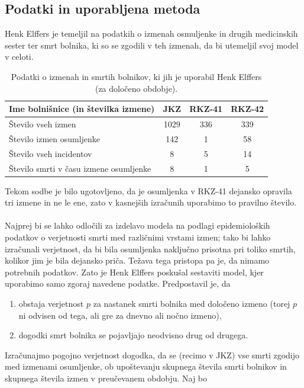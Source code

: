 \documentclass[mat1, tisk]{fmfdelo}
\theoremstyle{definition} %
\theoremstyle{trditev} %
\theoremstyle{izrek}
\begin{document}
\subsection{Podatki in uporabljena metoda}
Henk Elffers je temeljil na podatkih o izmenah osmuljenke in drugih medicinskih sester ter smrt bolnika, ki so se zgodili v teh izmenah, da bi 
utemeljil svoj model v celoti.
\begin{table}[h!]
    \centering
    \caption{Podatki o izmenah in smrtih bolnikov, ki jih je uporabil Henk Elffers (za določeno obdobje).}
    \label{table:1}
     \begin{tabular}{l c c c}
        \hline
        Ime bolnišnice (in številka izmene) & JKZ  & RKZ-41 & RKZ-42 \\ 
        \hline
        Število vseh izmen & 1029 & 336 & 339 \\
        Število izmen osumljenke & 142 & 1 & 58 \\
        Število vseh incidentov & 8 & 5 & 14 \\
        Število smrti v času izmene osumljenke & 8 & 1 & 5 \\
        \hline
     \end{tabular}
 \end{table}
Tekom sodbe je bilo ugotovljeno, da je osumljenka v RKZ-41 dejansko opravila tri izmene in ne le ene, zato v kasnejših izračunih uporabimo to 
pravilno število.\\\\
Najprej bi se lahko odločili za izdelavo modela na podlagi epidemioloških podatkov o verjetnosti smrti med različnimi vrstami izmen; 
tako bi lahko izračunali verjetnost, da bi bila osumljenka naključno prisotna pri toliko smrtih, kolikor jim je bila dejansko priča. Težava 
tega pristopa pa je, da nimamo potrebnih podatkov. Zato je Henk Elffers poskušal sestaviti model, kjer uporabimo samo zgoraj navedene podatke. Predpostavil 
je, da
\begin{enumerate}
    \item obstaja verjetnost $p$ za nastanek smrti bolnika med določeno izmeno (torej $p$ ni odvisen od tega, ali gre za dnevno ali nočno izmeno),
    \item dogodki smrt bolnika se pojavljajo neodvisno drug od drugega.
\end{enumerate}
Izračunajmo pogojno verjetnost dogodka, da se (recimo v JKZ) vse smrti zgodijo med izmenami osumljenke, ob upoštevanju skupnega števila 
smrti bolnikov in skupnega števila izmen v preučevanem obdobju. Naj bo\\
\end{document}
